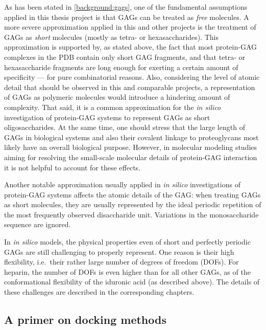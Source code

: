 As has been stated in \cref{background:gags}, one of the fundamental assumptions
applied in this thesis project is that GAGs can be treated as \textit{free}
molecules. A more severe approximation applied in this and other projects is the
treatment of GAGs as \textit{short} molecules (mostly as tetra- or
hexasaccharides). This approximation is supported by, as stated above, the fact
that most protein-GAG complexes in the PDB contain only short GAG fragments, and
that tetra- or hexasaccharide fragments are long enough for exerting a certain
amount of specificity --- for pure combinatorial reasons. Also, considering the
level of atomic detail that should be observed in this and comparable projects,
a representation of GAGs as polymeric molecules would introduce a hindering
amount of complexity. That said, it is a common approximation for the
\textit{in silico} investigation of protein-GAG systems to represent GAGs as
short oligosaccharides. At the same time, one should stress that the large
length of GAGs in biological systems and also their covalent linkage to
proteoglycans most likely have an overall biological purpose. However, in
molecular modeling studies aiming for resolving the small-scale molecular
details of protein-GAG interaction it is not helpful to account for these
effects.

Another notable approximation usually applied in \textit{in silico}
investigations of protein-GAG systems affects the atomic details of the GAG:
when treating GAGs as short molecules, they are usually represented by the ideal
periodic repetition of the most frequently observed disaccharide unit.
Variations in the monosaccharide sequence are ignored.

In \textit{in silico} models, the physical properties even of short and
perfectly periodic GAGs are still challenging to properly represent. One reason
is their high flexibility, i.e.\ their rather large number of degrees of freedom
(DOFs). For heparin, the number of DOFs is even higher than for all other GAGs,
as of the conformational flexibility of the iduronic acid (as described above).
The details of these challenges are described in the corresponding chapters.

\subsection{A primer on docking methods}

